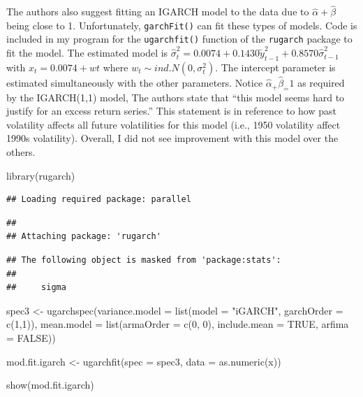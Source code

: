 \documentclass[
]{book}
\newenvironment{Shaded}{\begin{snugshade}}{\end{snugshade}}
\newcommand{\AttributeTok}[1]{\textcolor[rgb]{0.77,0.63,0.00}{#1}}
\newcommand{\ConstantTok}[1]{\textcolor[rgb]{0.00,0.00,0.00}{#1}}
\newcommand{\DecValTok}[1]{\textcolor[rgb]{0.00,0.00,0.81}{#1}}
\newcommand{\FunctionTok}[1]{\textcolor[rgb]{0.00,0.00,0.00}{#1}}
\newcommand{\NormalTok}[1]{#1}
\newcommand{\OtherTok}[1]{\textcolor[rgb]{0.56,0.35,0.01}{#1}}
\newcommand{\StringTok}[1]{\textcolor[rgb]{0.31,0.60,0.02}{#1}}
\theoremstyle{definition}
\theoremstyle{definition}
\theoremstyle{definition}
\theoremstyle{definition}
\theoremstyle{remark}
\begin{document}
The authors also suggest fitting an IGARCH model to the data due to \(\hat \alpha+\hat \beta\) being close to 1. Unfortunately, \texttt{garchFit()} can fit these types of models. Code is included in my program for the \texttt{ugarchfit()} function of the \texttt{rugarch} package to fit the model. The estimated model is \(\hat \sigma_t^2= 0.0074 + 0.1430\tilde y^2_{t-1} + 0.8570\hat \sigma_{t-1}^2\) with \(x_t = 0.0074 + wt\) where \(w_t\sim ind.N(0, \sigma_t^2)\). The intercept parameter is estimated simultaneously with the other parameters. Notice \(\hat \alpha_+\hat \beta_= 1\) as required by the IGARCH(1,1) model, The authors state that ``this model seems hard to justify for an excess return series.'' This statement is in reference to how past volatility affects all future volatilities for this model (i.e., 1950 volatility affect 1990s volatility). Overall, I did not see improvement with this model over the others.

\begin{Shaded}
\begin{Highlighting}[]
\FunctionTok{library}\NormalTok{(rugarch)}
\end{Highlighting}
\end{Shaded}

\begin{verbatim}
## Loading required package: parallel
\end{verbatim}

\begin{verbatim}
## 
## Attaching package: 'rugarch'
\end{verbatim}

\begin{verbatim}
## The following object is masked from 'package:stats':
## 
##     sigma
\end{verbatim}

\begin{Shaded}
\begin{Highlighting}[]
\NormalTok{spec3 }\OtherTok{\textless{}{-}} \FunctionTok{ugarchspec}\NormalTok{(}\AttributeTok{variance.model =} \FunctionTok{list}\NormalTok{(}\AttributeTok{model =} \StringTok{"iGARCH"}\NormalTok{, }\AttributeTok{garchOrder =} \FunctionTok{c}\NormalTok{(}\DecValTok{1}\NormalTok{,}\DecValTok{1}\NormalTok{)),}
     \AttributeTok{mean.model =} \FunctionTok{list}\NormalTok{(}\AttributeTok{armaOrder =} \FunctionTok{c}\NormalTok{(}\DecValTok{0}\NormalTok{, }\DecValTok{0}\NormalTok{), }\AttributeTok{include.mean =} \ConstantTok{TRUE}\NormalTok{, }\AttributeTok{arfima =} \ConstantTok{FALSE}\NormalTok{))}

\NormalTok{mod.fit.igarch }\OtherTok{\textless{}{-}} \FunctionTok{ugarchfit}\NormalTok{(}\AttributeTok{spec =}\NormalTok{ spec3, }\AttributeTok{data =} \FunctionTok{as.numeric}\NormalTok{(x))}
  
\FunctionTok{show}\NormalTok{(mod.fit.igarch)  }
\end{Highlighting}
\end{Shaded}
\end{document}

